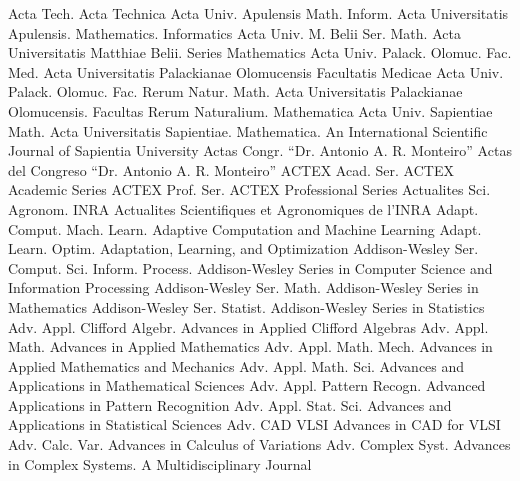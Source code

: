 {Acta Tech.}
{Acta Technica}
{Acta Univ. Apulensis Math. Inform.}
{Acta Universitatis Apulensis. Mathematics. Informatics}
{Acta Univ. M. Belii Ser. Math.}
{Acta Universitatis Matthiae Belii. Series Mathematics}
{Acta Univ. Palack. Olomuc. Fac. Med.}
{Acta Universitatis Palackianae Olomucensis Facultatis Medicae}
{Acta Univ. Palack. Olomuc. Fac. Rerum Natur. Math.}
{Acta Universitatis Palackianae Olomucensis. Facultas Rerum Naturalium. Mathematica}
{Acta Univ. Sapientiae Math.}
{Acta Universitatis Sapientiae. Mathematica. An International Scientific Journal of Sapientia University}
{Actas Congr. ``Dr. Antonio A. R. Monteiro''}
{Actas del Congreso ``Dr. Antonio A. R. Monteiro''}
{ACTEX Acad. Ser.}
{ACTEX Academic Series}
{ACTEX Prof. Ser.}
{ACTEX Professional Series}
{Actualites Sci. Agronom. INRA}
{Actualites Scientifiques et Agronomiques de l'INRA}
{Adapt. Comput. Mach. Learn.}
{Adaptive Computation and Machine Learning}
{Adapt. Learn. Optim.}
{Adaptation, Learning, and Optimization}
{Addison-Wesley Ser. Comput. Sci. Inform. Process.}
{Addison-Wesley Series in Computer Science and Information Processing}
{Addison-Wesley Ser. Math.}
{Addison-Wesley Series in Mathematics}
{Addison-Wesley Ser. Statist.}
{Addison-Wesley Series in Statistics}
{Adv. Appl. Clifford Algebr.}
{Advances in Applied Clifford Algebras}
{Adv. Appl. Math.}
{Advances in Applied Mathematics}
{Adv. Appl. Math. Mech.}
{Advances in Applied Mathematics and Mechanics}
{Adv. Appl. Math. Sci.}
{Advances and Applications in Mathematical Sciences}
{Adv. Appl. Pattern Recogn.}
{Advanced Applications in Pattern Recognition}
{Adv. Appl. Stat. Sci.}
{Advances and Applications in Statistical Sciences}
{Adv. CAD VLSI}
{Advances in CAD for VLSI}
{Adv. Calc. Var.}
{Advances in Calculus of Variations}
{Adv. Complex Syst.}
{Advances in Complex Systems. A Multidisciplinary Journal}
